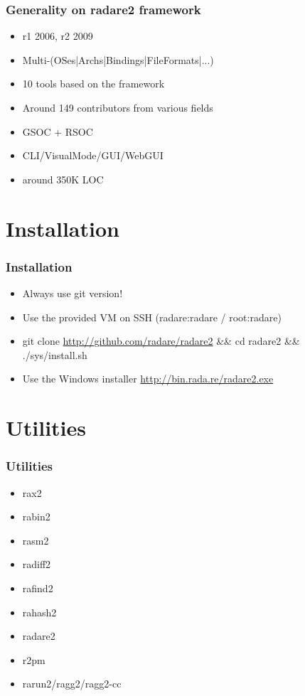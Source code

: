 \documentclass[10pt,pdf,utf8,english,compress,hyperref={unicode}]{beamer}
\begin{document}
\begin{frame}[fragile]
  \frametitle{Generality on radare2 framework}
  \begin{itemize}
  \item r1 2006, r2 2009
  \item Multi-(OSes|Archs|Bindings|FileFormats|...)
  \item 10 tools based on the framework
  \item Around 149 contributors from various fields
  \item GSOC + RSOC
  \item CLI/VisualMode/GUI/WebGUI
  \item around 350K LOC
  \end{itemize}
\end{frame}

\section{Installation}

\begin{frame}[fragile]
  \frametitle{Installation}
  \begin{itemize}
  \item Always use git version!
  \item Use the provided VM on SSH (\alert{radare:radare} / \alert{root:radare})
  \item \alert{git clone {\url{http://github.com/radare/radare2}} \&\& cd radare2 \&\& ./sys/install.sh}
  \item Use the Windows installer \alert{{\url{http://bin.rada.re/radare2.exe}}}
  \end{itemize}
\end{frame}

\section{Utilities}

\begin{frame}[fragile]
  \frametitle{Utilities}
     \begin{itemize}
        \item rax2
        \item rabin2
        \item rasm2
        \item radiff2
        \item rafind2
        \item rahash2
        \item radare2
        \item r2pm
        \item rarun2/ragg2/ragg2-cc
      \end{itemize}
\end{frame}
\end{document}

